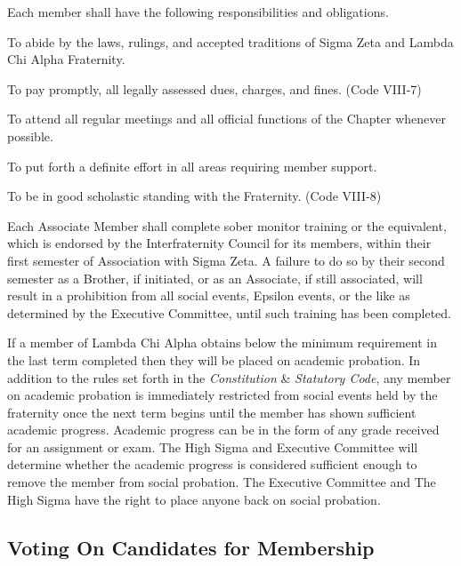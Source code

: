 \documentclass{article}
\begin{document}
Each member shall have the following responsibilities and obligations.

\begin{subsubsectionList}
  \item To abide by the laws, rulings, and accepted traditions of Sigma Zeta and
  Lambda Chi Alpha Fraternity.

  \item To pay promptly, all legally assessed dues, charges, and fines. (Code
  VIII‑7)

  \item To attend all regular meetings and all official functions of the Chapter
  whenever possible.

  \item To put forth a definite effort in all areas requiring member support.

  \item To be in good scholastic standing with the Fraternity. (Code VIII‑8)

  \item Each Associate Member shall complete sober monitor training or the
  equivalent, which is endorsed by the Interfraternity Council for its members,
  within their first semester of Association with Sigma Zeta. A failure to do so
  by their second semester as a Brother, if initiated, or as an Associate, if
  still associated, will result in a prohibition from all social events, Epsilon
  events, or the like as determined by the Executive Committee, until such
  training has been completed.

  \item If a member of Lambda Chi Alpha obtains below the minimum 
  requirement in the last term completed then they will be placed on academic
  probation. In addition to the rules set forth in the \emph{Constitution} \&
  \emph{Statutory Code}, any member on academic probation is immediately
  restricted from social events held by the fraternity once the next term begins
  until the member has shown sufficient academic progress. Academic progress can
  be in the form of any grade received for an assignment or exam. The High Sigma
  and Executive Committee will determine whether the academic progress is
  considered sufficient enough to remove the member from social probation. The
  Executive Committee and The High Sigma have the right to place anyone back on
  social probation.
\end{subsubsectionList}

\subsection{Voting On Candidates for Membership}
\end{document}
